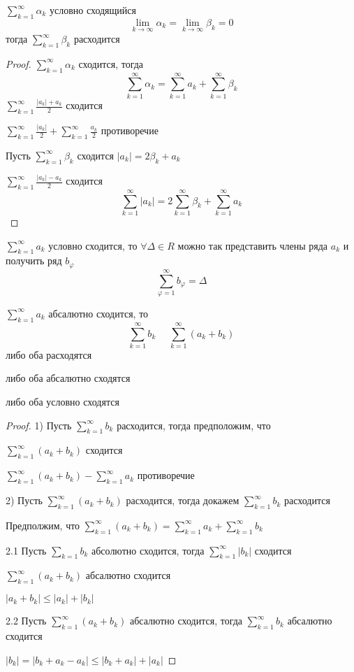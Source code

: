 \begin{theorem}
  $\sum_{k=1}^{\infty} \alpha_k$ условно сходящийся
  $$
  \lim_{k \to \infty} \alpha_k = \lim_{k \to \infty} \beta_k = 0
  $$
  тогда $\sum_{k=1}^{\infty} \beta_k$ расходится
\end{theorem}

\begin{proof}
  $\sum_{k=1}^{\infty} \alpha_k$ сходится, тогда
  $$
  \sum_{k=1}^{\infty} \alpha_k =
  \sum_{k=1}^{\infty} a_k + \sum_{k=1}^{\infty} \beta_k
  $$
  $\sum_{k=1}^{\infty} \frac{|a_k| + a_k}{2}$ сходится

  $\sum_{k=1}^{\infty} \frac{|a_k|}{2} + \sum_{k=1}^{\infty} \frac{a_k}{2}$
  противоречие

  Пусть $\sum_{k=1}^{\infty} \beta_k$ сходится
  $|a_k| = 2\beta_k + a_k$

  $\sum_{k=1}^{\infty} \frac{|a_k| - a_k}{2}$ сходится
  $$
  \sum_{k=1}^{\infty} |a_k| =
  2 \sum_{k=1}^{\infty} \beta_k +
  \sum_{k=1}^{\infty} a_k
  $$
\end{proof}

\begin{theorem}[Римана]
  $\sum_{k=1}^{\infty} a_k$ условно сходится, то $\forall \Delta \in R $ можно
  так представить члены ряда $a_k$ и получить ряд $b_{\varphi}$
  $$
  \sum_{\varphi=1}^{\infty} b_{\varphi} = \Delta
  $$
\end{theorem}

\begin{theorem}
  $\sum_{k=1}^{\infty} a_k$ абсалютно сходится, то
  $$
  \sum_{k=1}^{\infty} b_k ~~~~~~ \sum_{k=1}^{\infty} (a_k + b_k)
  $$
  либо оба расходятся

  либо оба абсалютно сходятся

  либо оба условно сходятся
\end{theorem}

\begin{proof}
  1) Пусть $\sum_{k=1}^{\infty} b_k$ расходится, тогда предположим, что

  $\sum_{k=1}^{\infty} (a_k + b_k)$ сходится

  $\sum_{k=1}^{\infty} (a_k + b_k) - \sum_{k=1}^{\infty} a_k$ противоречие

  2) Пусть $\sum_{k=1}^{\infty} (a_k + b_k)$ расходится, тогда докажем
  $\sum_{k=1}^{\infty} b_k$ расходится

  Предполжим, что $\sum_{k=1}^{\infty} (a_k + b_k) =
  \sum_{k=1}^{\infty} a_k + \sum_{k=1}^{\infty} b_k$

  2.1 Пусть $\sum_{k=1} b_k$ абсолютно сходится, тогда
  $\sum_{k=1}^{\infty} |b_k|$ сходится

  $\sum_{k=1}^{\infty} (a_k + b_k)$ абсалютно сходится

  $|a_k + b_k| \le |a_k| + |b_k|$

  2.2 Пусть $\sum_{k=1}^{\infty} (a_k + b_k)$ абсалютно сходится, тогда
  $\sum_{k=1}^{\infty} b_k$ абсалютно сходится

  $|b_k| = |b_k + a_k - a_k| \le | b_k + a_k| + |a_k|$
\end{proof}